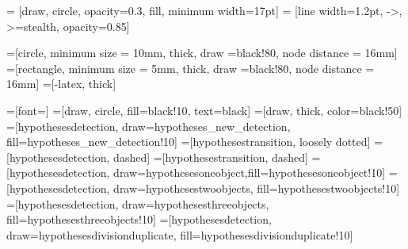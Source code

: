 \usepackage{tikz}
\usetikzlibrary{arrows}
\usetikzlibrary{snakes}
\usetikzlibrary{backgrounds}
\usetikzlibrary{patterns}
\usetikzlibrary{matrix}
\usetikzlibrary{shapes}
\usetikzlibrary{fit}
\usetikzlibrary{calc}
\usetikzlibrary{shadows}
\usetikzlibrary{plotmarks}
\usetikzlibrary{positioning}

 = [draw, circle, opacity=0.3, fill, minimum width=17pt]
 = [line width=1.2pt, ->, >=stealth, opacity=0.85]




=[circle, minimum size = 10mm, thick, draw =black!80, node distance = 16mm]
=[rectangle, minimum size = 5mm, thick, draw =black!80, node distance = 16mm]
=[-latex, thick]



=[font=\huge]
=[draw, circle, fill=black!10, text=black]
=[draw, thick, color=black!50]
=[hypothesesdetection, draw=hypotheses_new_detection, fill=hypotheses_new_detection!10]
=[hypothesestransition, loosely dotted]
=[hypothesesdetection, dashed]
=[hypothesestransition, dashed]
=[hypothesesdetection, draw=hypothesesoneobject,fill=hypothesesoneobject!10]
=[hypothesesdetection, draw=hypothesestwoobjects, fill=hypothesestwoobjects!10]
=[hypothesesdetection, draw=hypothesesthreeobjects, fill=hypothesesthreeobjects!10]
=[hypothesesdetection, draw=hypothesesdivisionduplicate,
fill=hypothesesdivisionduplicate!10]


